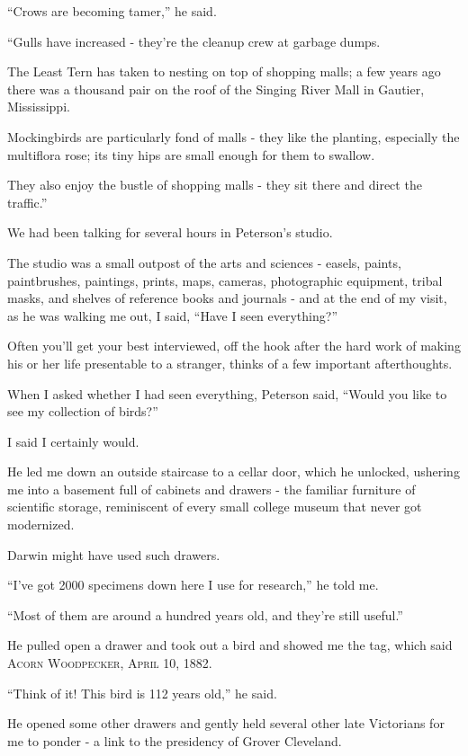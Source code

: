 \documentclass{book}
\numberwithin{equation}{section}
\begin{document}
%
``Crows are becoming tamer,'' he said.

``Gulls have increased - they're the cleanup crew at garbage dumps.

The Least Tern has taken to nesting on top of shopping malls; a few years ago there was a thousand pair on the roof of the Singing River Mall in Gautier, Mississippi.

Mockingbirds are particularly fond of malls - they like the planting, especially the multiflora rose; its tiny hips are small enough for them to swallow.

They also enjoy the bustle of shopping malls - they sit there and direct the traffic.''

%
We had been talking for several hours in Peterson's studio.

The studio was a small outpost of the arts and sciences - easels, paints, paintbrushes, paintings, prints, maps, cameras, photographic equipment, tribal masks, and shelves of reference books and journals - and at the end of my visit, as he was walking me out, I said, ``Have I seen everything?''

Often you'll get your best interviewed, off the hook after the hard work of making his or her life presentable to a stranger, thinks of a few important afterthoughts.

%
When I asked whether I had seen everything, Peterson said, ``Would you like to see my collection of birds?''

I said I certainly would.

He led me down an outside staircase to a cellar door, which he unlocked, ushering me into a basement full of cabinets and drawers - the familiar furniture of scientific storage, reminiscent of every small college museum that never got modernized.

Darwin might have used such drawers.

%
``I've got 2000 specimens down here I use for research,'' he told me.

``Most of them are around a hundred years old, and they're still useful.''

He pulled open a drawer and took out a bird and showed me the tag, which said \textsc{Acorn Woodpecker, April 10, 1882}.

``Think of it! This bird is 112 years old,'' he said.

He opened some other drawers and gently held several other late Victorians for me to ponder - a link to the presidency of Grover Cleveland.
\end{document}
